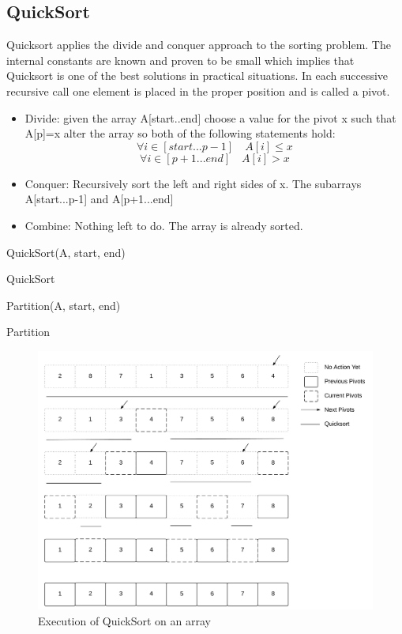 \documentclass[12pt,letterpaper]{article}
\begin{document}
\subsection{QuickSort}
Quicksort applies the divide and conquer approach to the sorting problem. The internal constants are known and proven to be small which implies that Quicksort is one of the best solutions in practical situations. In each successive recursive call one element is placed in the proper position and is called a pivot. 
\begin{itemize}
\item Divide: given the array A[start..end] choose a value for the pivot x such that A[p]=x alter the array so both of the following statements hold:\\
\[ \forall i \in [start...p-1] \quad A[i]\leq x \]
\[ \forall i \in [p+1...end] \quad A[i] > x \]
\item Conquer: Recursively sort the left and right sides of x. The subarrays A[start...p-1] and A[p+1...end]
\item Combine: Nothing left to do. The array is already sorted.
\end{itemize}
\begin{algorithm}
QuickSort(A, start, end)
\caption{QuickSort}
\label{QuickSort}
\end{algorithm}
\begin{algorithm}
Partition(A, start, end)
\caption{Partition}
\label{Partition}
\end{algorithm}
\begin{figure}[htb!]
\centering
\includegraphics[width=13cm]{quicksortbetter}
\caption{Execution of QuickSort on an array}
\end{figure}
\end{document}
